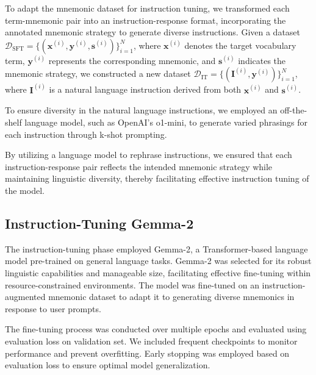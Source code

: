 \documentclass[11pt, onecolumn]{article}
\newcounter{para}
\begin{document}
To adapt the mnemonic dataset for instruction tuning, we transformed each term-mnemonic pair into an instruction-response format, incorporating the annotated mnemonic strategy to generate diverse instructions. Given a dataset \( \mathcal{D}_{\text{SFT}} = \{(\mathbf{x}^{(i)}, \mathbf{y}^{(i)}, \mathbf{s}^{(i)})\}_{i=1}^N \), where \( \mathbf{x}^{(i)} \) denotes the target vocabulary term, \( \mathbf{y}^{(i)} \) represents the corresponding mnemonic, and \( \mathbf{s}^{(i)} \) indicates the mnemonic strategy, we constructed a new dataset \( \mathcal{D}_{\text{IT}} = \{(\mathbf{I}^{(i)}, \mathbf{y}^{(i)})\}_{i=1}^N \), where \( \mathbf{I}^{(i)} \) is a natural language instruction derived from both \( \mathbf{x}^{(i)} \) and \( \mathbf{s}^{(i)} \).

To ensure diversity in the natural language instructions, we employed an off-the-shelf language model, such as OpenAI's o1-mini, to generate varied phrasings for each instruction through k-shot prompting.

By utilizing a language model to rephrase instructions, we ensured that each instruction-response pair reflects the intended mnemonic strategy while maintaining linguistic diversity, thereby facilitating effective instruction tuning of the model.

\subsection{Instruction-Tuning Gemma-2} \label{sec:met-it-gemma}

The instruction-tuning phase employed Gemma-2, a Transformer-based language model pre-trained on general language tasks. Gemma-2 was selected for its robust linguistic capabilities and manageable size, facilitating effective fine-tuning within resource-constrained environments. The model was fine-tuned on an instruction-augmented mnemonic dataset to adapt it to generating diverse mnemonics in response to user prompts.

The fine-tuning process was conducted over multiple epochs and evaluated using evaluation loss on validation set. We included frequent checkpoints to monitor performance and prevent overfitting. Early stopping was employed based on evaluation loss to ensure optimal model generalization.

\end{document}
